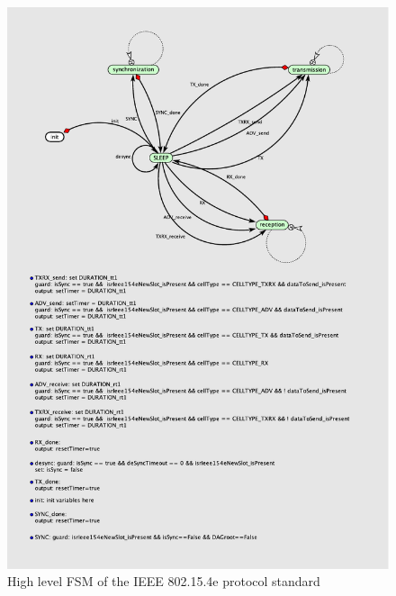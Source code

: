 \begin{figure}
  \centering
  \includegraphics[width=\textwidth]{figures/FSM.pdf}
  \caption{High level FSM of the IEEE 802.15.4e protocol standard}
  \label{fig:fsm}
\end{figure}

